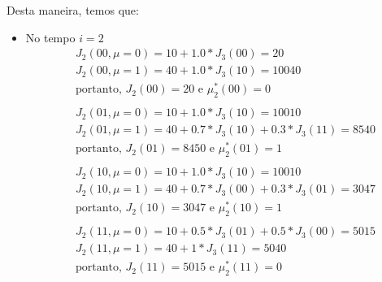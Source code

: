 \documentclass[12pt]{article}
\begin{document}
Desta maneira, temos que:
\begin{itemize}
  \item{No tempo $i = 2$}
  \begin{align*}
    &J_2 (00, \mu = 0) = 10 + 1.0 * J_3 (00) = 20 \\
    &J_2 (00, \mu = 1) = 40 + 1.0 * J_3 (10) = 10040  \\
    &\text{portanto, } J_2 (00) = 20 \text{ e } \mu_2^* (00) = 0\\
    &\\
    &J_2 (01, \mu = 0) = 10 + 1.0 * J_3 (10) = 10010 \\
    &J_2 (01, \mu = 1) = 40 + 0.7 * J_3 (10) + 0.3 * J_3 (11) = 8540 \\
    &\text{portanto, } J_2 (01) = 8450 \text{ e } \mu_2^* (01) = 1\\
    &\\
    &J_2 (10, \mu = 0) = 10 + 1.0 * J_3 (10) = 10010 \\
    &J_2 (10, \mu = 1) = 40 + 0.7 * J_3 (00) + 0.3 * J_3 (01) = 3047 \\
    &\text{portanto, } J_2 (10) = 3047 \text{ e } \mu_2^* (10) = 1\\
    &\\
    &J_2 (11, \mu = 0) = 10 + 0.5 * J_3 (01) + 0.5 * J_3 (00) =  5015\\
    &J_2 (11, \mu = 1) = 40 + 1 * J_3 (11) = 5040 \\
    &\text{portanto, } J_2 (11) = 5015 \text{ e } \mu_2^* (11) = 0\\
    &\\
  \end{align*}
  

\end{itemize}
\end{document}
